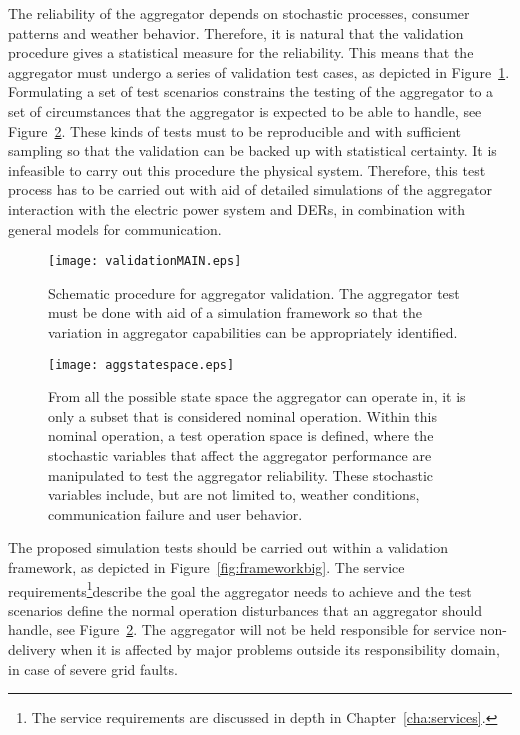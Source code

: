 The reliability of the aggregator depends on stochastic processes, \eg consumer patterns and weather behavior. Therefore, it is natural that the validation procedure gives a statistical measure for the reliability. This means that the aggregator must undergo a series of validation test cases, as depicted in Figure~\ref{fig:MAINframework}. Formulating a set of test scenarios constrains the testing of the aggregator to a set of circumstances that the aggregator is expected to be able to handle, see Figure~\ref{fig:aggstatespace}. These kinds of tests must to be reproducible and with sufficient sampling so that the validation can be backed up with statistical certainty. It is infeasible to carry out this procedure the physical system. Therefore, this test process has to be carried out with aid of detailed simulations of the aggregator interaction with the electric power system and DERs, in combination with general models for communication.
\begin{figure}[htbp!]
\centering
\texttt{[image: validationMAIN.eps]}
\caption{Schematic procedure for aggregator validation. The aggregator test must be done with aid of a simulation framework so that the variation in aggregator capabilities can be appropriately identified.}
\label{fig:MAINframework}
\end{figure}

\begin{figure}[hpb!]
\centering
\texttt{[image: aggstatespace.eps]}
\caption{From all the possible state space the aggregator can operate in, it is only a subset that is considered nominal operation. Within this nominal operation, a test operation space is defined, where the stochastic variables that affect the aggregator performance are manipulated to test the aggregator reliability. These stochastic variables include, but are not limited to, weather conditions, communication failure and user behavior.}
\label{fig:aggstatespace}
\end{figure}

The proposed simulation tests should be carried out within a validation framework, as depicted in Figure~\ref{fig:frameworkbig}. The service requirements\footnote{The service requirements are discussed in depth in Chapter~\ref{cha:services}.}describe the goal the aggregator needs to achieve and the test scenarios define the normal operation disturbances that an aggregator should handle, see Figure~\ref{fig:aggstatespace}. The aggregator will not be held responsible for service non-delivery when it is affected by major problems outside its responsibility domain, \eg in case of severe grid faults. %

